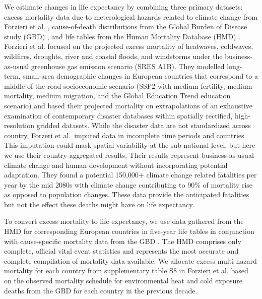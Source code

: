 \documentclass[12pt,]{article}
\begin{document}
We estimate changes in life expectancy by combining three primary
datasets: excess mortality data due to meterological hazards related to
climate change from Forzieri et al. \citep{forzieri2017increasing},
cause-of-death distributions from the Global Burden of Disease study
(GBD) \citep{GBD, wang2012age}, and life tables from the Human Mortality
Database (HMD) \citep{HMD}. Forzieri et al.
\citep{forzieri2017increasing} focused on the projected excess mortality
of heatwaves, coldwaves, wildfires, droughts, river and coastal floods,
and windstorms under the business-as-usual greenhouse gas emission
scenario (SRES A1B). They modelled long-term, small-area demographic
changes in European countries that correspond to a middle-of-the-road
socioeconomic scenario (SSP2 with medium fertility, medium mortality,
medium migration, and the Global Education Trend education scenario) and
based their projected mortality on extrapolations of an exhaustive
examination of contemporary disaster databases within spatially
rectified, high-resolution gridded datasets. While the disaster data are
not standardized across country, Forzeri et al.~imputed data in
incomplete time periods and countries. This imputation could mask
spatial variability at the sub-national level, but here we use their
country-aggregated results. Their results represent business-as-usual
climate change and human development without incorporating potential
adaptation. They found a potential 150,000+ climate change related
fatalities per year by the mid 2080s with climate change contributing to
90\% of mortality rise as opposed to population changes. These data
provide the anticipated fatalities but not the effect these deaths might
have on life expectancy.

To convert excess mortality to life expectancy, we use data gathered
from the HMD \citep{HMD} for corresponding European countries in
five-year life tables in conjunction with cause-specific mortality data
from the GBD \citep{GBD, wang2012age}. The HMD comprises only complete,
official vital event statistics and represents the most accurate and
complete compilation of mortality data available. We allocate excess
multi-hazard mortality for each country from supplementary table S8 in
Forzieri et al. \citep{forzieri2017increasing} based on the observed
mortality schedule for environmental heat and cold exposure deaths from
the GBD for each country in the previous decade.
\end{document}
